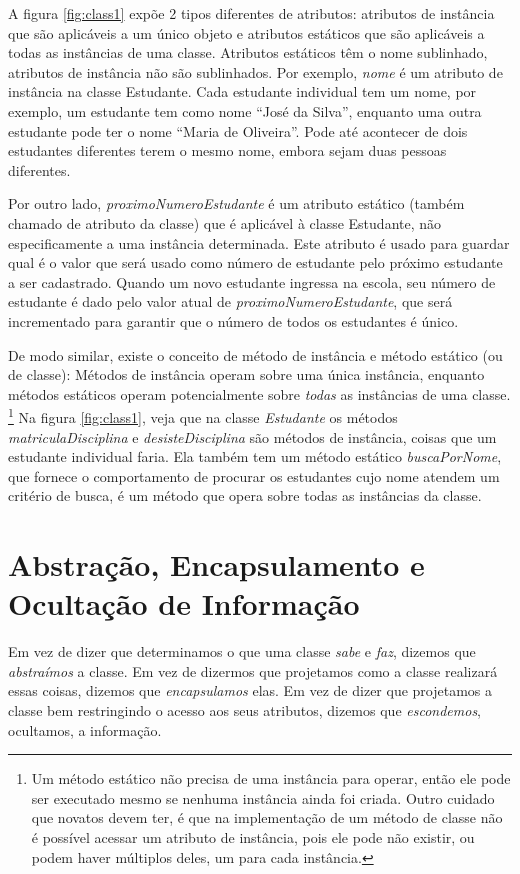 \documentclass[
	article,			%
	12pt,				%
	openright,
	twoside,			%
	a4paper,			%
	english,			%
	french,
	brazil,				%
	sumario=tradicional
	]{abntex2}
\begin{document}
A figura \ref{fig:class1} expõe 2 tipos diferentes de atributos: atributos de instância que são aplicáveis a um único objeto e atributos estáticos que são aplicáveis a todas as instâncias de uma classe. Atributos estáticos têm o nome sublinhado, atributos de instância não são sublinhados. Por exemplo, \emph{nome} é um atributo de instância na classe Estudante. Cada estudante individual tem um nome, por exemplo, um estudante tem como nome ``José da Silva'', enquanto uma outra estudante pode ter o nome ``Maria de Oliveira''. Pode até acontecer de dois estudantes diferentes terem o mesmo nome, embora sejam duas pessoas diferentes.

Por outro lado, \emph{proximoNumeroEstudante} é um atributo estático (também chamado de atributo da classe) que é aplicável à classe Estudante, não especificamente a uma instância determinada. Este atributo é usado para guardar qual é o valor que será usado como número de estudante pelo próximo estudante a ser cadastrado. Quando um novo estudante ingressa na escola, seu número de estudante é dado pelo valor atual de \emph{proximoNumeroEstudante}, que será incrementado para garantir que o número de todos os estudantes é único.

De modo similar, existe o conceito de método de instância e método estático (ou de classe): Métodos de instância operam sobre uma única instância, enquanto métodos estáticos operam potencialmente sobre \textit{todas} as instâncias de uma classe. \footnote{Um método estático não precisa de uma instância para operar, então ele pode ser executado mesmo se nenhuma instância ainda foi criada. Outro cuidado que novatos devem ter, é que na implementação de um método de classe não é possível acessar um atributo de instância, pois ele pode não existir, ou podem haver múltiplos deles, um para cada instância.} Na figura \ref{fig:class1}, veja que na classe \emph{Estudante} os métodos \emph{matriculaDisciplina} e \emph{desisteDisciplina} são métodos de instância, coisas que um estudante individual faria. Ela também tem um método estático \emph{buscaPorNome}, que fornece o comportamento de procurar os estudantes cujo nome atendem um critério de busca, é um método que opera sobre todas as instâncias da classe.

\section{Abstração, Encapsulamento e Ocultação de Informação}

Em vez de dizer que determinamos o que uma classe \textit{sabe} e \textit{faz}, dizemos que \emph{abstraímos} a classe. Em vez de dizermos que projetamos como a classe realizará essas coisas, dizemos que \emph{encapsulamos} elas. Em vez de dizer que projetamos a classe bem restringindo o acesso aos seus atributos, dizemos que \emph{escondemos}, ocultamos, a informação.
\end{document}
